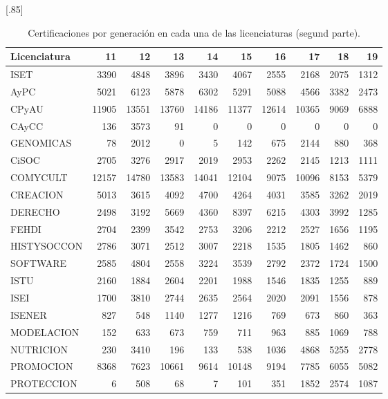 \documentclass[12pt]{article}
\begin{document}
\begin{table}[ht!]
\centering
\scalebox{0.75}[.85]{
\begin{tabular}{lrrrrrrrrr}
  \hline
  \hline  
Licenciatura & 11 & 12 & 13 & 14 & 15 & 16 & 17 & 18 & 19 \\ 
  \hline\hline
ISET & 3390 & 4848 & 3896 & 3430 & 4067 & 2555 & 2168 & 2075 & 1312 \\ 
  AyPC & 5021 & 6123 & 5878 & 6302 & 5291 & 5088 & 4566 & 3382 & 2473 \\ 
  CPyAU & 11905 & 13551 & 13760 & 14186 & 11377 & 12614 & 10365 & 9069 & 6888\\ 
  CAyCC &  136 & 3573 &  91 &   0 &   0 &   0 &   0 &   0 &   0 \\ 
  GENOMICAS &  78 & 2012 &   0 &   5 & 142 & 675 & 2144 & 880 & 368\\ 
  CiSOC &  2705 & 3276 & 2917 & 2019 & 2953 & 2262 & 2145 & 1213 & 1111\\ 
  COMYCULT & 12157 & 14780 & 13583 & 14041 & 12104 & 9075 & 10096 & 8153 & 5379\\ 
  CREACION & 5013 & 3615 & 4092 & 4700 & 4264 & 4031 & 3585 & 3262 & 2019\\ 
  DERECHO &  2498 & 3192 & 5669 & 4360 & 8397 & 6215 & 4303 & 3992 & 1285\\ 
  FEHDI & 2704 & 2399 & 3542 & 2753 & 3206 & 2212 & 2527 & 1656 & 1195\\ 
  HISTYSOCCON & 2786 & 3071 & 2512 & 3007 & 2218 & 1535 & 1805 & 1462 & 860\\ 
  SOFTWARE & 2585 & 4804 & 2558 & 3224 & 3539 & 2792 & 2372 & 1724 & 1500\\ 
  ISTU & 2160 & 1884 & 2604 & 2201 & 1988 & 1546 & 1835 & 1255 & 889\\ 
  ISEI & 1700 & 3810 & 2744 & 2635 & 2564 & 2020 & 2091 & 1556 & 878\\ 
  ISENER &827 & 548 & 1140 & 1277 & 1216 & 769 & 673 & 860 & 363\\ 
  MODELACION & 152 & 633 & 673 & 759 & 711 & 963 & 885 & 1069 & 788\\ 
  NUTRICION & 230 & 3410 & 196 & 133 & 538 & 1036 & 4868 & 5255 & 2778\\ 
  PROMOCION & 8368 & 7623 & 10661 & 9614 & 10148 & 9194 & 7785 & 6055 & 5082\\ 
  PROTECCION &  6 & 508 &  68 &   7 & 101 & 351 & 1852 & 2574 & 1087\\ 
   \hline
\end{tabular}
}
\caption{\label{Prob_Cert_Lic_Gen2}Certificaciones por generaci\'on en cada una de las licenciaturas (segund parte).}
\end{table}
\end{document}
